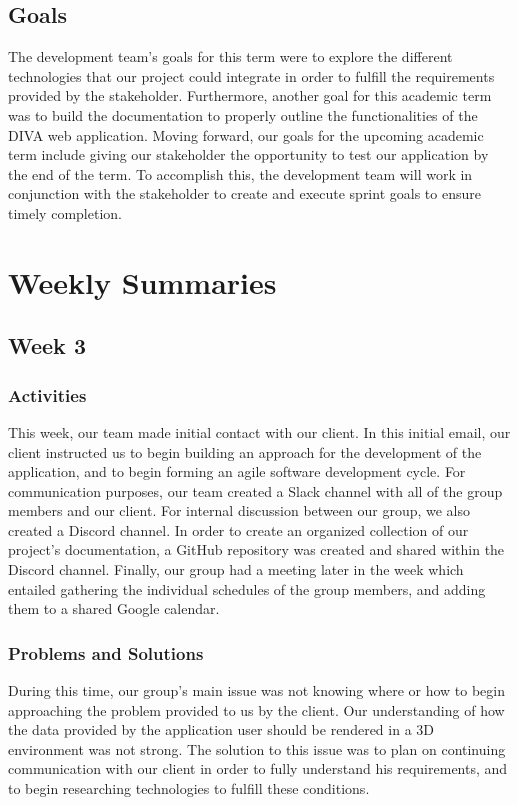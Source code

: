 \documentclass[journal,10pt,onecolumn,compsoc]{IEEEtran} \usepackage[margin=1.0in]{geometry} \usepackage{pdfpages}
\begin{document}
\subsection{Goals}
The development team's goals for this term were to explore the different technologies that our project could integrate in order to fulfill the requirements provided by the stakeholder. Furthermore, another goal for this academic term was to build the documentation to properly outline the functionalities of the DIVA web application. Moving forward, our goals for the upcoming academic term include giving our stakeholder the opportunity to test our application by the end of the term. To accomplish this, the development team will work in conjunction with the stakeholder to create and execute sprint goals to ensure timely completion. 

\section{Weekly Summaries}
\subsection{Week 3}
    \subsubsection{Activities}
    This week, our team made initial contact with our client. In this initial email, our client instructed us to begin building an approach for the development of the application, and to begin forming an agile software development cycle. For communication purposes, our team created a Slack channel with all of the group members and our client. For internal discussion between our group, we also created a Discord channel. In order to create an organized collection of our project's documentation, a GitHub repository was created and shared within the Discord channel. Finally, our group had a meeting later in the week which entailed gathering the individual schedules of the group members, and adding them to a shared Google calendar. 
    \subsubsection{Problems and Solutions}
    During this time, our group's main issue was not knowing where or how to begin approaching the problem provided to us by the client. Our understanding of how the data provided by the application user should be rendered in a 3D environment was not strong. The solution to this issue was to plan on continuing communication with our client in order to fully understand his requirements, and to begin researching technologies to fulfill these conditions.
    
\end{document}
